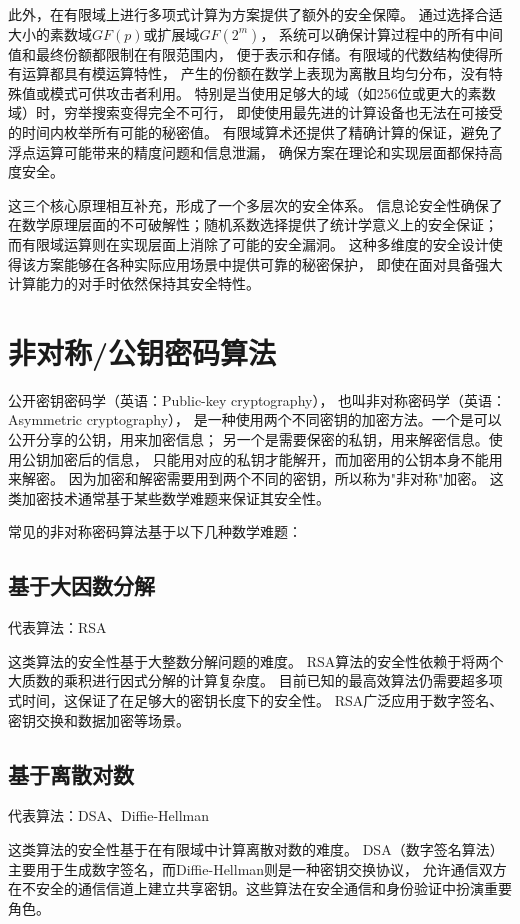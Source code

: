 此外，在有限域上进行多项式计算为方案提供了额外的安全保障。
通过选择合适大小的素数域$GF(p)$或扩展域$GF(2^m)$，
系统可以确保计算过程中的所有中间值和最终份额都限制在有限范围内，
便于表示和存储。有限域的代数结构使得所有运算都具有模运算特性，
产生的份额在数学上表现为离散且均匀分布，没有特殊值或模式可供攻击者利用。
特别是当使用足够大的域（如256位或更大的素数域）时，穷举搜索变得完全不可行，
即使使用最先进的计算设备也无法在可接受的时间内枚举所有可能的秘密值。
有限域算术还提供了精确计算的保证，避免了浮点运算可能带来的精度问题和信息泄漏，
确保方案在理论和实现层面都保持高度安全。

这三个核心原理相互补充，形成了一个多层次的安全体系。
信息论安全性确保了在数学原理层面的不可破解性；随机系数选择提供了统计学意义上的安全保证；
而有限域运算则在实现层面上消除了可能的安全漏洞。
这种多维度的安全设计使得该方案能够在各种实际应用场景中提供可靠的秘密保护，
即使在面对具备强大计算能力的对手时依然保持其安全特性。

\section{非对称/公钥密码算法}

公开密钥密码学（英语：Public-key cryptography），
也叫非对称密码学（英语：Asymmetric cryptography），
是一种使用两个不同密钥的加密方法。一个是可以公开分享的公钥，用来加密信息；
另一个是需要保密的私钥，用来解密信息。使用公钥加密后的信息，
只能用对应的私钥才能解开，而加密用的公钥本身不能用来解密。
因为加密和解密需要用到两个不同的密钥，所以称为"非对称"加密。
这类加密技术通常基于某些数学难题来保证其安全性。

常见的非对称密码算法基于以下几种数学难题：


\subsection{基于大因数分解}
代表算法：RSA

这类算法的安全性基于大整数分解问题的难度。
RSA算法的安全性依赖于将两个大质数的乘积进行因式分解的计算复杂度。
目前已知的最高效算法仍需要超多项式时间，这保证了在足够大的密钥长度下的安全性。
RSA广泛应用于数字签名、密钥交换和数据加密等场景。

\subsection{基于离散对数}
代表算法：DSA、Diffie-Hellman

这类算法的安全性基于在有限域中计算离散对数的难度。
DSA（数字签名算法）主要用于生成数字签名，而Diffie-Hellman则是一种密钥交换协议，
允许通信双方在不安全的通信信道上建立共享密钥。这些算法在安全通信和身份验证中扮演重要角色。

